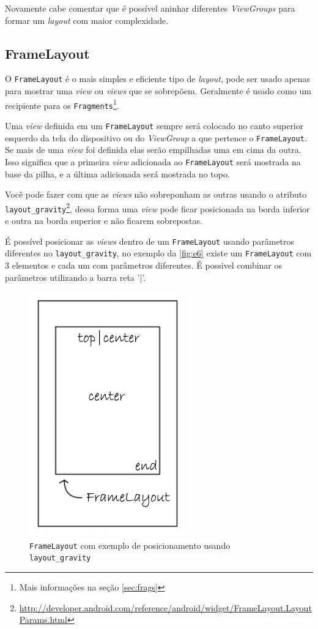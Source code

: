 \documentclass[a4paper,12pt,brazil,oneside]{book}
\begin{document}
\begin{singlespace}
Novamente cabe comentar que é possível aninhar diferentes \emph{ViewGroups} para formar um \emph{layout} com maior complexidade.

\subsection{FrameLayout}

O \texttt{FrameLayout} é o mais simples e eficiente tipo de \emph{layout}, pode ser usado apenas para mostrar uma \emph{view} ou \emph{views} que se sobrepõem. Geralmente é usado como um recipiente para os \texttt{Fragments}\footnote{Mais informações na seção \ref{sec:frags}}.

Uma \emph{view} definida em um \texttt{FrameLayout} sempre será colocado no canto superior esquerdo da tela do dispositivo ou do \emph{ViewGroup} a que pertence o \texttt{FrameLayout}. Se mais de uma \emph{view} foi definida elas serão empilhadas uma em cima da outra. Isso significa que a primeira \emph{view} adicionada ao \texttt{FrameLayout} será mostrada na base da pilha, e a última adicionada será mostrada no topo.

Você pode fazer com que as \emph{views} não sobreponham as outras usando o atributo \\ \texttt{layout\_gravity}\footnote{\href{http://developer.android.com/reference/android/widget/FrameLayout.LayoutParams.html}{http://developer.android.com/reference/android/widget/FrameLayout.LayoutParams.html}}, dessa forma uma \emph{view} pode ficar posicionada na borda inferior e outra na borda superior e não ficarem sobrepostas.

É possível posicionar as \emph{views} dentro de um \texttt{FrameLayout} usando parâmetros diferentes no \texttt{layout\_gravity}, no exemplo da \autoref{fig:e6} existe um \texttt{FrameLayout} com 3 elementos e cada um com parâmetros diferentes. É possivel combinar os parâmetros utilizando a barra reta '|'.

\begin{figure}[H]
  \centering
  \includegraphics[width=.25\textwidth]{figuras/design/framelayout_gravity.jpg}
  \caption{\texttt{FrameLayout} com exemplo de posicionamento usando \texttt{layout\_gravity}}
  \label{fig:e6}
\end{figure}


\end{singlespace}
\end{document}
